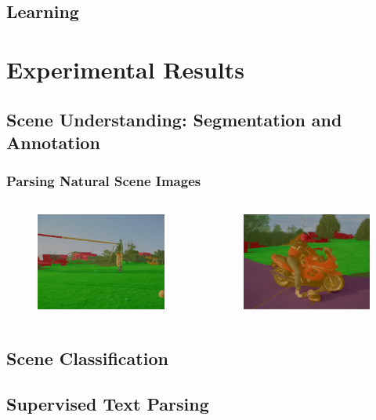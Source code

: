 \documentclass{beamer}
\begin{document}
\subsection{Learning}
\frame
{
}
\section{Experimental Results}
\subsection{Scene Understanding: Segmentation and Annotation}
\frame
{
  \frametitle{Parsing Natural Scene Images}
  \begin{columns}
  \begin{figure}[ht]  
	  \begin{center}
		  \includegraphics[width=2.1in]{images/ex1_ext.png}   
	  \end{center}   
  \end{figure}
  \begin{figure}[ht]
	  \begin{center}
		  \includegraphics[width=2.1in]{images/ex1_ext2.png} 
	  \end{center}
  \end{figure}
  \end{columns}
}
\subsection{Scene Classification}
\frame
{
}
\subsection{Supervised Text Parsing}
\frame
{
}
\end{document}

